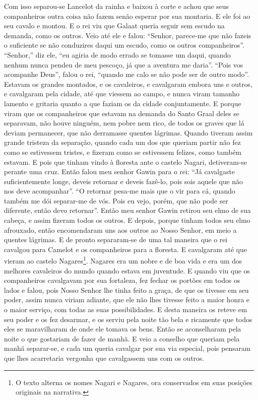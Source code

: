 Com isso separou-se Lancelot da rainha e baixou à corte e achou que seus
companheiros outra coisa não fazem senão esperar por sua montaria. E ele foi ao
seu cavalo e montou. E o rei viu que Galaat queria seguir sem escudo na
demanda, como os outros. Veio até ele e falou: “Senhor, parece-me que não
fazeis o suficiente se não conduzires daqui um escudo, como os outros
companheiros”. “Senhor,” diz ele, “eu agiria de modo errado se tomasse um
daqui, quando nenhum nunca pendeu de meu pescoço, já que a aventura me daria”.
“Pois vos acompanhe Deus”, falou o rei, “quando me calo se não pode ser de
outro modo”. Estavam os grandes montados, e os cavaleiros, e cavalgaram
embora uns e outros, e cavalgaram pela cidade, até que viessem ao campo, e
nunca viram tamanho lamento e gritaria quanto a que faziam os da cidade
conjuntamente. E porque viram que os companheiros que estavam na demanda do
Santo Graal deles se separavam, não houve ninguém, nem pobre nem rico, de todos
os graves que lá deviam permanecer, que não derramasse quentes lágrimas. Quando
tiveram assim grande tristeza da separação, quando cada um dos que queriam
partir não fez como se estivessem tristes, e fizeram como se estivessem
felizes, como também estavam. E pois que tinham vindo à floresta ante o castelo
Nagari, detiveram-se perante uma cruz. Então falou meu senhor Gawin para o rei:
“Já cavalgaste suficientemente longe, deveis retornar e deveis fazê-lo, pois
sois aquele que não nos deve acompanhar”. “O retornar pesa-me mais que o vir
para cá, quando também me dói separar-me de vós. Pois eu vejo, porém, que não
pode ser diferente, então devo retornar”. Então meu senhor Gawin
retirou seu elmo de sua cabeça, e assim fizeram todos os outros. E depois,
porque tinham todos seu elmo afrouxado, então encomendaram uns aos outros ao
Nosso Senhor, em meio a quentes lágrimas. E de pronto separaram-se de uma tal
maneira que o rei cavalgou para Camelot e os companheiros para a floresta. E
cavalgaram até que vieram ao castelo Nagares\footnote{ O texto
alterna os nomes Nagari e Nagares, ora conservados em suas posições originais
na narrativa.}. Nagares era um nobre e de boa vida e era um dos
melhores cavaleiros do mundo quando estava em juventude. E quando viu que os
companheiros cavalgavam por sua fortaleza, fez fechar os portões em todos os
lados e falou, pois Nosso Senhor lhe tinha feito a graça, de que os tivesse em
seu poder, assim nunca viriam adiante, que ele não lhes tivesse feito a maior
honra e o maior serviço, com todas as suas possibilidades. E desta maneira os
reteve em seu poder e os fez desarmar, e os serviu pela noite tão bela e
ricamente que todos eles se maravilharam de onde ele tomava os bens. Então se
aconselharam pela noite o que gostariam de fazer de manhã. E veio a conselho
que queriam pela manhã separar-se, e cada um queria cavalgar por sua via
especial, pois pensaram que lhes acarretaria vergonha que cavalgassem uns com
os outros.

